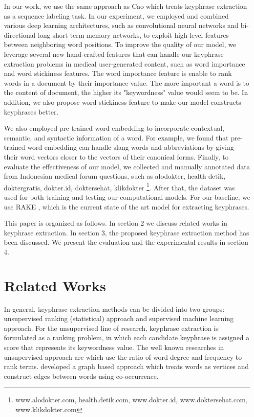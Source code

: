 In our work, we use the same approach as Cao \cite{cao2010automatically} which treats keyphrase extraction as a sequence labeling task. In our experiment, we employed and combined various deep learning architectures, such as convolutional neural networks and bi-directional long short-term memory networks, to exploit high level features between neighboring word positions. To improve the quality of our model, we leverage several new hand-crafted features that can handle our keyphrase extraction problems in medical user-generated content, such as word importance and word stickiness features. The word importance feature is enable to rank words in a document by their importance value. The more important a word is to the content of document, the higher its "keywordness" value would seem to be. In addition, we also propose word stickiness feature to make our model constructs keyphrases better. 

We also employed pre-trained word embedding to incorporate contextual, semantic, and syntactic information of a word. For example, we found that pre-trained word embedding can handle slang words and abbreviations by giving their word vectors closer to the vectors of their canonical forms. Finally, to evaluate the effectiveness of our model, we collected and manually annotated data from Indonesian medical forum questions, such as alodokter, health detik, doktergratis, dokter.id, doktersehat, klikdokter \footnote{www.alodokter.com, health.detik.com, www.dokter.id, www.doktersehat.com, www.klikdokter.com}. After that, the dataset was used for both training and testing our computational models. For our baseline, we use RAKE  \cite{rake}, which is the current state of the art model for extracting keyphrases.


This paper is organized as follows.  In section 2 we discuss related works in keyphrase extraction. In section 3, the proposed keyphrase extraction method has been discussed. We present the evaluation and the experimental results in section 4. 
\fi
\section{Related Works}
In general, keyphrase extraction methods can be divided into two groups: unsupervised ranking (statistical) approach and supervised machine learning approach. For the unsupervised line of research, keyphrase extraction is formulated as a ranking problem, in which each candidate keyphrase is assigned a score that represents its keywordness value. The well known researches in unsupervised approach are \cite{rake} which use the ratio of word degree and frequency to rank terms. \cite{mihalcea2004textrank} developed a graph based approach which treats words as vertices and construct edges between words using co-occurrence.

